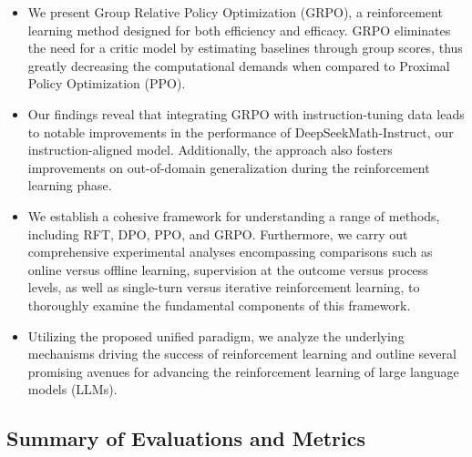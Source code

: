 \begin{itemize}[topsep=0pt]
    \item We present Group Relative Policy Optimization (GRPO), a reinforcement learning method designed for both efficiency and efficacy. GRPO eliminates the need for a critic model by estimating baselines through group scores, thus greatly decreasing the computational demands when compared to Proximal Policy Optimization (PPO).
    \item Our findings reveal that integrating GRPO with instruction-tuning data leads to notable improvements in the performance of DeepSeekMath-Instruct, our instruction-aligned model. Additionally, the approach also fosters improvements on out-of-domain generalization during the reinforcement learning phase.
    \item We establish a cohesive framework for understanding a range of methods, including RFT, DPO, PPO, and GRPO. Furthermore, we carry out comprehensive experimental analyses encompassing comparisons such as online versus offline learning, supervision at the outcome versus process levels, as well as single-turn versus iterative reinforcement learning, to thoroughly examine the fundamental components of this framework.
    \item Utilizing the proposed unified paradigm, we analyze the underlying mechanisms driving the success of reinforcement learning and outline several promising avenues for advancing the reinforcement learning of large language models (LLMs).
\end{itemize}

\subsection{Summary of Evaluations and Metrics}

